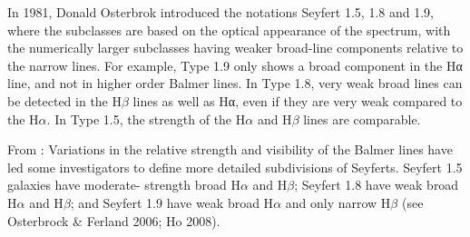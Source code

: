 \documentclass[11pt]{article}
\begin{document}
In 1981, Donald Osterbrok introduced the notations Seyfert 1.5, 1.8 and 1.9, where the subclasses are based on the optical appearance of the spectrum, with the numerically larger subclasses having weaker broad-line components relative to the narrow lines. For example, Type 1.9 only shows a broad component in the Hα line, and not in higher order Balmer lines. In Type 1.8, very weak broad lines can be detected in the H$\beta$ lines as well as Hα, even if they are very weak compared to the H$\alpha$. In Type 1.5, the strength of the H$\alpha$ and H$\beta$ lines are comparable.


\smallskip
\smallskip
\noindent
From \citet{Roig14}: 
Variations in the relative strength and visibility of the Balmer lines have led some investigators to define more detailed subdivisions of Seyferts. Seyfert 1.5 galaxies have moderate- strength broad H$\alpha$ and H$\beta$; Seyfert 1.8 have weak broad H$\alpha$ and H$\beta$; and Seyfert 1.9 have weak broad H$\alpha$ and only narrow H$\beta$ (see Osterbrock \& Ferland 2006; Ho 2008).
\end{document}
